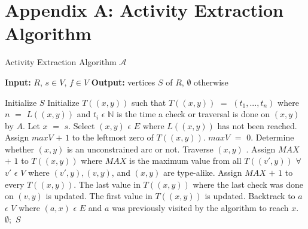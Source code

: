 \appendix
\section*{Appendix A: Activity Extraction Algorithm}
\begin{algorithm}[H]
    \caption{Activity Extraction Algorithm ${\mathcal A}$ \cite{Malinao2017, Sulla2023}}
    \label{ActivityExtraction}
    \begin{algorithmic}
        \State \textbf{Input:} $ R $, $ s \in V $, $ f \in V $
        \State \textbf{Output:} vertices $ S $ of $ R $, $ \emptyset $ otherwise
    \end{algorithmic}
    \begin{algorithmic}[1]
        \State Initialize $ S $
            \State Initialize $ T((x,y)) $ such that $ T((x,y)) $ $ = $ $ (t_1, ..., t_n) $ where $ n $ $ = $ $ L((x,y)) $ and $ t_i $ $ \epsilon $ $ \mathbb{N} $ is the time a check or traversal is done on $ (x,y) $ by $ A $.
        \EndFor
        \State Let $ x $ $ = $ $ s $.
            \State Select $ (x,y) $ $ \epsilon $ $ E $ where $ L((x,y)) $ has not been reached.
                \State Assign $ maxV $ $ + $ $ 1 $ to the leftmost zero of $ T((x,y)) $. 
            \Else
                \State $ maxV $ $ = $ $ 0 $.
            \EndIf
            \State Determine whether $ (x,y) $ is an unconstrained arc or not.
                \State Traverse $ (x,y) $ .
                \State Assign $ MAX $ $ + $ $ 1 $ to $ T((x,y)) $ where $ MAX $ is the maximum value from all $ T((v',y)) $ $ \forall $ $ v' $ $ \epsilon $ $ V $ where $ (v',y),(v,y) $, and $ (x,y) $ are type-alike.
                    \State Assign $ MAX $ $ + $ $ 1 $ to every $ T((x,y)) $.
                        \State The last value in $ T((x,y)) $ where the last check was done on $ (v,y) $ is updated.
                        \State The first value in $ T((x,y)) $ is updated.
                    \EndIf
                \EndFor
                \State Backtrack to $ a $ $ \epsilon $ $ V $ where $ (a,x) $ $ \epsilon $ $ E $ and $ a $ was previously visited by the algorithm to reach $ x $.
            \EndIf
        \EndWhile
            \State \Return $ \emptyset; $
        \Else
            \State \Return $ S $
        \EndIf
    \end{algorithmic}
\end{algorithm}

